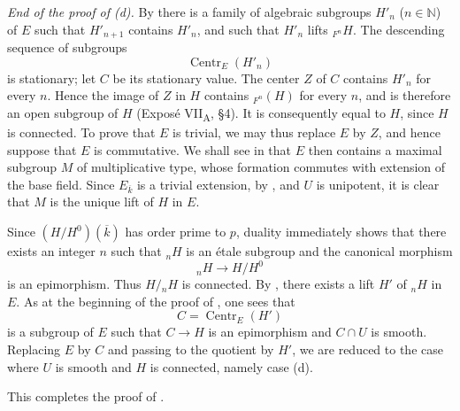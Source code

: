 \smallskip
\noindent
\emph{End of the proof of (d).}
By  there is a family of algebraic subgroups
\(H'_n\) (\(n\in\mathbb N\)) of \(E\) such that
\(H'_{n+1}\) contains \(H'_n\), and such that \(H'_n\) lifts
\({}_{F^n}H\).  The descending sequence of subgroups
\[
  \operatorname{Centr}_E(H'_n)
\]
is stationary; let \(C\) be its stationary value.  The center \(Z\)
of \(C\) contains \(H'_n\) for every \(n\).  Hence the image of
\(Z\) in \(H\) contains \({}_{F^n}(H)\) for every \(n\), and is
therefore an open subgroup of \(H\) (Exposé VII\textsubscript{A},
\S 4).  It is consequently equal to \(H\), since \(H\) is
connected.  To prove that \(E\) is trivial, we may thus replace
\(E\) by \(Z\), and hence suppose that \(E\) is commutative.  We
shall see in  that \(E\) then contains a maximal subgroup \(M\)
of multiplicative type, whose formation commutes with extension of
the base field.  Since \(E_{\overline{k}}\) is a trivial extension,
by , and \(U\) is unipotent, it is clear that \(M\) is
the unique lift of \(H\) in \(E\).

Since \((H/H^0)(\overline{k})\) has order prime to \(p\), duality
immediately shows that there exists an integer \(n\) such that
\({}_nH\) is an étale subgroup and the canonical morphism
\[
  {}_nH\longrightarrow H/H^0
\]
is an epimorphism.  Thus \(H/{}_nH\) is connected.  By ,
there exists a lift \(H'\) of \({}_nH\) in \(E\).  As at the
beginning of the proof of , one sees that
\[
  C=\operatorname{Centr}_E(H')
\]
is a subgroup of \(E\) such that \(C\longrightarrow H\) is an
epimorphism and \(C\cap U\) is smooth.  Replacing \(E\) by \(C\)
and passing to the quotient by \(H'\), we are reduced to the case
where \(U\) is smooth and \(H\) is connected, namely case (d).

This completes the proof of .



